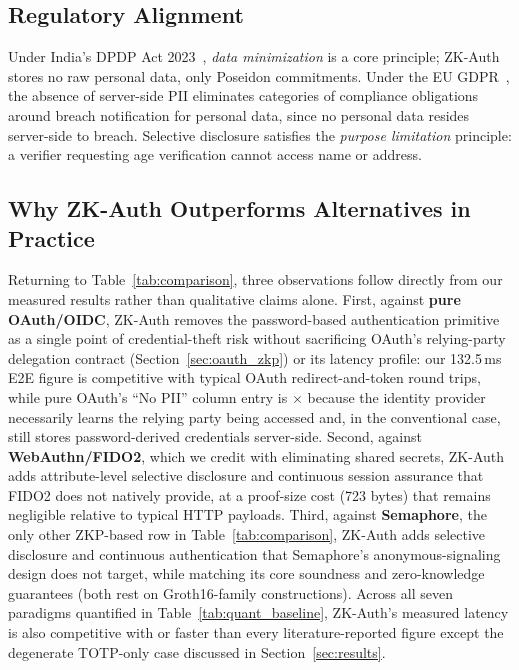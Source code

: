 \documentclass[journal,twoside,10pt]{IEEEtran}
\begin{document}
\subsection{Regulatory Alignment}

Under India's DPDP Act 2023~\cite{dpdp}, \textit{data minimization} is a
core principle; ZK-Auth stores no raw personal data, only Poseidon
commitments. Under the EU GDPR~\cite{gdpr}, the absence of server-side PII
eliminates categories of compliance obligations around breach notification
for personal data, since no personal data resides server-side to breach.
Selective disclosure satisfies the \textit{purpose limitation} principle: a
verifier requesting age verification cannot access name or address.

\subsection{Why ZK-Auth Outperforms Alternatives in Practice}

Returning to Table~\ref{tab:comparison}, three observations follow directly
from our measured results rather than qualitative claims alone. First,
against \textbf{pure OAuth/OIDC}, ZK-Auth removes the password-based
authentication primitive as a single point of credential-theft risk
without sacrificing OAuth's relying-party delegation contract
(Section~\ref{sec:oauth_zkp}) or its latency profile: our 132.5\,ms E2E
figure is competitive with typical OAuth redirect-and-token round trips,
while pure OAuth's ``No PII'' column entry is $\times$ because the
identity provider necessarily learns the relying party being accessed
and, in the conventional case, still stores password-derived credentials
server-side. Second, against \textbf{WebAuthn/FIDO2}, which we credit
with eliminating shared secrets, ZK-Auth adds attribute-level selective
disclosure and continuous session assurance that FIDO2 does not natively
provide, at a proof-size cost (723 bytes) that remains negligible
relative to typical HTTP payloads. Third, against \textbf{Semaphore}, the
only other ZKP-based row in Table~\ref{tab:comparison}, ZK-Auth adds
selective disclosure and continuous authentication that Semaphore's
anonymous-signaling design does not target, while matching its core
soundness and zero-knowledge guarantees (both rest on Groth16-family
constructions). Across all seven paradigms quantified in
Table~\ref{tab:quant_baseline}, ZK-Auth's measured latency is also
competitive with or faster than every literature-reported figure except
the degenerate TOTP-only case discussed in Section~\ref{sec:results}.
\end{document}
